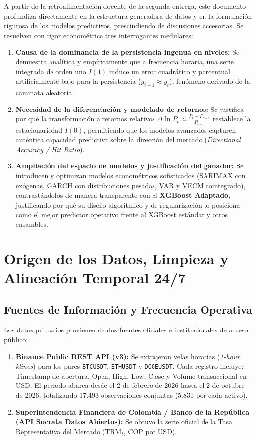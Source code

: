 \documentclass[12pt,letterpaper]{article}
\begin{document}
A partir de la retroalimentación docente de la segunda entrega, este documento profundiza directamente en la estructura generadora de datos y en la formulación rigurosa de los modelos predictivos, prescindiendo de discusiones accesorias. Se resuelven con rigor econométrico tres interrogantes medulares:
\begin{enumerate}
    \item \textbf{Causa de la dominancia de la persistencia ingenua en niveles:} Se demuestra analítica y empíricamente que a frecuencia horaria, una serie integrada de orden uno $I(1)$ induce un error cuadrático y porcentual artificialmente bajo para la persistencia ($y_{t+1} \approx y_t$), fenómeno derivado de la caminata aleatoria.
    \item \textbf{Necesidad de la diferenciación y modelado de retornos:} Se justifica por qué la transformación a retornos relativos $\Delta \ln P_t \approx \frac{P_t - P_{t-1}}{P_{t-1}}$ restablece la estacionariedad $I(0)$, permitiendo que los modelos avanzados capturen auténtica capacidad predictiva sobre la dirección del mercado (\textit{Directional Accuracy / Hit Ratio}).
    \item \textbf{Ampliación del espacio de modelos y justificación del ganador:} Se introducen y optimizan modelos econométricos sofisticados (SARIMAX con exógenas, GARCH con distribuciones pesadas, VAR y VECM cointegrado), contrastándolos de manera transparente con el \textbf{XGBoost Adaptado}, justificando por qué su diseño algorítmico y de regularización lo posiciona como el mejor predictor operativo frente al XGBoost estándar y otros ensambles.
\end{enumerate}

\section{Origen de los Datos, Limpieza y Alineación Temporal 24/7}

\subsection{Fuentes de Información y Frecuencia Operativa}
Los datos primarios provienen de dos fuentes oficiales e institucionales de acceso público:
\begin{enumerate}
    \item \textbf{Binance Public REST API (v3):} Se extrajeron velas horarias (\textit{1-hour klines}) para los pares \texttt{BTCUSDT}, \texttt{ETHUSDT} y \texttt{DOGEUSDT}. Cada registro incluye: Timestamp de apertura, Open, High, Low, Close y Volume transaccional en USD. El periodo abarca desde el 2 de febrero de 2026 hasta el 2 de octubre de 2026, totalizando 17.493 observaciones conjuntas (5.831 por cada activo).
    \item \textbf{Superintendencia Financiera de Colombia / Banco de la República (API Socrata Datos Abiertos):} Se obtuvo la serie oficial de la Tasa Representativa del Mercado ($\text{TRM}_t$, COP por USD).
\end{enumerate}
\end{document}
